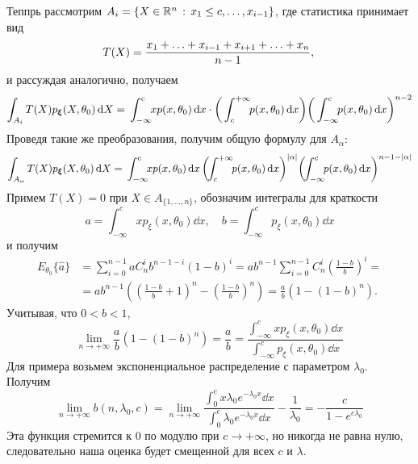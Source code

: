     Теппрь рассмотрим $A_i = \{X \in \mathbb{R}^n\,:\,x_1\le c,\ldots,x_{i-1}\}$, где статистика принимает вид
    \begin{equation*}
        T(X) = \frac{x_1+\ldots+x_{i-1}+x_{i+1}+\ldots+x_n}{n-1}, \\
    \end{equation*}
    и рассуждая аналогично, получаем
    \begin{equation*}
        \int_{A_i}T(X)p_{\boldsymbol{\xi}}(X,\theta_0)\,\mathrm{d} X = \\\int_{-\infty}^{c}\!\!xp(x,\theta_0)\,\mathrm{d} x \cdot \bigg(\int_{c}^{+\infty}\!\!p(x,\theta_0)\,\mathrm{d} x\bigg) \bigg(\int_{-\infty}^{c}\!\!p(x,\theta_0)\,\mathrm{d} x\bigg)^{n-2}
    \end{equation*}
    Проведя такие же преобразования, получим общую формулу для $A_\alpha$:
    \begin{equation*}
        \int_{A_\alpha}T(X)\pvec(X,\theta_0)\dd X = \\\int_{-\infty}^{c}\!\!xp(x,\theta_0)\dd x\,\bigg(\!\!\int_{c}^{+\infty}\!\!p(x,\theta_0)\dd x\bigg)^{|\alpha|} \bigg(\!\!\int_{-\infty}^{c}\!\!p(x,\theta_0)\dd x\bigg)^{n-1-|\alpha|}
    \end{equation*}
    Примем $T(X) = 0$ при $X \in A_{\{1,\ldots,n\}}$, обозначим интегралы для краткости
    \begin{equation*}
        a = \int_{-\infty}^{c}x p_\xi(x,\theta_0)\dd x, \quad b = \int_{-\infty}^{c}p_\xi(x,\theta_0)\dd x
    \end{equation*}
    и получим
    \begin{align*}
        E_{\theta_0}\{\hat{a}\} &= \sum_{i=0}^{n-1}a C_n^i b^{n-1-i}(1-b)^i = ab^{n-1}\sum_{i=0}^{n-1}C_n^i\left(\frac{1-b}{b}\right)^i = \\
        &= ab^{n-1}\left(\left(\frac{1-b}{b}+1\right)^n - \left(\frac{1-b}{b}\right)^n\right) = \frac{a}{b}(1-(1-b)^n).
    \end{align*}
    Учитывая, что $0 < b < 1$, 
    \begin{equation*}
        \lim_{n\to +\infty}\frac{a}{b}(1-(1-b)^n) = \frac{a}{b} = \frac{\int_{-\infty}^{c}x p_\xi(x,\theta_0)\dd x}{\int_{-\infty}^{c}p_\xi(x,\theta_0)\dd x}
    \end{equation*}
    Для примера возьмем экспоненциальное распределение с параметром $\lambda_0$. Получим
    \begin{equation*}
        \lim_{n\to +\infty}b(n,\lambda_0,c) = \lim_{n\to +\infty}\frac{\int_{0}^{c}x \lambda_0 e^{-\lambda_0 x}\dd x}{\int_{0}^{c}\lambda_0 e^{-\lambda_0 x}\dd x} - \frac{1}{\lambda_0} = -\frac{c}{1-e^{c\lambda_0}}
    \end{equation*}
    Эта функция стремится к 0 по модулю при $c\to +\infty$, но никогда не равна нулю, следовательно наша оценка будет смещенной для всех $c$ и $\lambda$.

